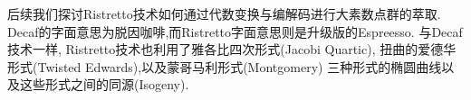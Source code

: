 \documentclass{article}
\begin{document}
后续我们探讨Ristretto技术如何通过代数变换与编解码进行大素数点群的萃取.
Decaf的字面意思为脱因咖啡,而Ristretto字面意思则是升级版的Espreesso. 
与Decaf技术一样, Ristretto技术也利用了雅各比四次形式(Jacobi Quartic), 
扭曲的爱德华形式(Twisted Edwards),以及蒙哥马利形式(Montgomery)
三种形式的椭圆曲线以及这些形式之间的同源(Isogeny).
\end{document}
